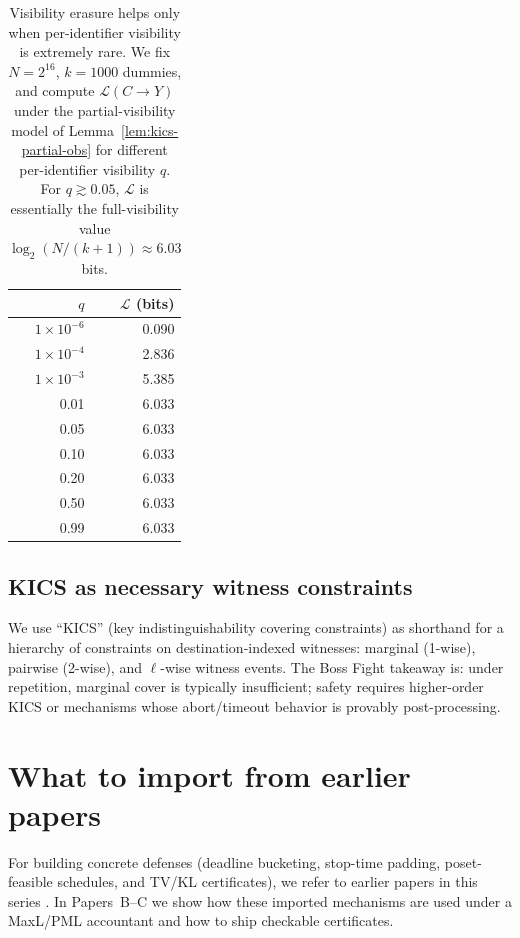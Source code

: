 \documentclass[11pt]{article}
\newcommand{\MaxL}{\mathcal{L}}
\newcommand{\logtwo}{\log_2}
\begin{document}
\begin{table}[t]
\centering
\caption{Visibility erasure helps only when per-identifier visibility is extremely rare. We fix $N=2^{16}$, $k=1000$ dummies, and compute $\MaxL(C\!\to\!Y)$ under the partial-visibility model of Lemma~\ref{lem:kics-partial-obs} for different per-identifier visibility $q$. For $q\gtrsim 0.05$, $\MaxL$ is essentially the full-visibility value $\logtwo(N/(k{+}1))\approx 6.03$ bits.}
\label{tab:visibility-sweep}
\begin{tabular}{r r}
\toprule
$q$ & $\MaxL$ (bits)\\
\midrule
$1\times 10^{-6}$ & 0.090\\
$1\times 10^{-4}$ & 2.836\\
$1\times 10^{-3}$ & 5.385\\
0.01 & 6.033\\
0.05 & 6.033\\
0.10 & 6.033\\
0.20 & 6.033\\
0.50 & 6.033\\
0.99 & 6.033\\
\bottomrule
\end{tabular}
\end{table}

\subsection{KICS as necessary witness constraints}
We use ``KICS'' (key indistinguishability covering constraints) as shorthand for a hierarchy of constraints on destination-indexed witnesses:
marginal (1-wise), pairwise (2-wise), and $\ell$-wise witness events.
The Boss Fight takeaway is: under repetition, marginal cover is typically insufficient; safety requires higher-order KICS or mechanisms whose abort/timeout behavior is provably post-processing.

\section{What to import from earlier papers}\label{sec:import}
For building concrete defenses (deadline bucketing, stop-time padding, poset-feasible schedules, and TV/KL certificates), we refer to earlier papers in this series
\cite{series:schedcompiler,series:knapsacktransport,series:prefixcapacities,series:stoptimeaddendum}.
In Papers~B--C we show how these imported mechanisms are used under a MaxL/PML accountant and how to ship checkable certificates.
\end{document}
